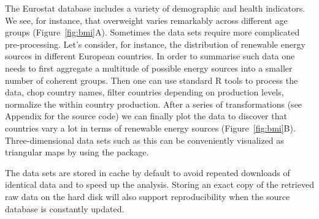 The Eurostat database includes a variety of demographic and health
indicators. We see, for instance, that overweight varies remarkably
across different age groups (Figure~\ref{fig:bmi}A). Sometimes the
data sets require more complicated pre-processing. Let's consider, for
instance, the distribution of renewable energy sources in different
European countries. In order to summarise such data one needs to first
aggregate a multitude of possible energy sources into a smaller number
of coherent groups. Then one can use standard R tools to process the
data, chop country names, filter countries depending on production
levels, normalize the within country production. After a series of
transformations (see Appendix for the source code) we can finally plot
the data to discover that countries vary a lot in terms of renewable
energy sources (Figure~\ref{fig:bmi}B). Three-dimensional data sets
such as this can be conveniently visualized as triangular maps by
using the  \citep{plotrix} package.

The data sets are stored in cache by default to avoid repeated
downloads of identical data and to speed up the analysis. Storing
an exact copy of the retrieved raw data on the hard disk will also
support reproducibility when the source database is constantly
updated.



